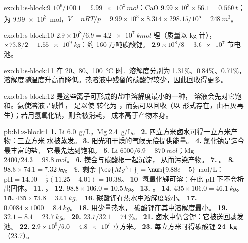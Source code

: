\begin{solution}{exo:b1:s-block:9}
$10^6/100.1 = \qty{9.99e3}{mol}$：CaO $9.99 \times 10^3 \times 56.1 =
\qty{0.560}{t}$； 为 \qty{9.99e3}{mol}，$V = nRT/p = 9.99 \times 10^3
\times 8.314 \times 298.15/10^5 = \qty{248}{m^3}$。
\end{solution}

\begin{solution}{exo:b1:s-block:10}
$2.9 \times 10^8/6.9 = \qty{4.2e7}{kmol}$ 锂（质量以 kg 计），$\times 73.8/2 =
\qty{1.55e9}{kg}$：约 160 万吨碳酸锂。
$2.9 \times 10^8/8 = \num{3.6e7}$ 节电池。
\end{solution}

\begin{solution}{exo:b1:s-block:11}
在 20、80、\qty{100}{\celsius} 时，溶解度分别为 1.31\%、0.84\%、0.71\%，
溶解度随温度升高而降低。热溶液中残留的碳酸锂较少，因此回收得更多。
\end{solution}

\begin{solution}{exo:b1:s-block:12}
 是这些离子可形成的盐中溶解度最小的一种，
溶液会先对它饱和。氨使溶液呈碱性，
足以使  转化为 ，而氨可以回收（以
 形式存在，由石灰再生）；若用氢氧化钠，则会被消耗，
成本高于产物本身。
\end{solution}

\begin{solution}{pb:b1:s-block:1}
\textbf{1.} Li \qty{6.0}{g/L}，Mg \qty{2.4}{g/L}。
\textbf{2.} 四立方米卤水可得一立方米产物：三立方米
水被蒸发。
\textbf{3.} 阳光和干燥的气候无偿提供能量。
\textbf{4.} 氯化钠是迄今最丰富的盐，
它最先达到饱和。
\textbf{5.} Li $6000/6.9 = \qty{870}{mol}$；Mg $2400/24.3 = \qty{98.8}{mol}$。
\textbf{6.} 镁会与碳酸根一起沉淀，
从而污染产物。
\textbf{7.} 。
\textbf{8.} $98.8 \times 74.1 = \qty{7.32}{kg}$。
\textbf{9.} 剩余 $[\ce{Mg^2+}] = \num{9.88e-5}$ mol/L：$\mathrm{pH} = 14.00 -
\frac12(11.25 - 4.01) = 10.38$。
\textbf{10.} 氢氧化锂可溶：在此 pH 下不会析出固体。
\textbf{11.} 。
\textbf{12.} $98.8 \times 106.0 = \qty{10.5}{kg}$。
\textbf{13.} 。
\textbf{14.} $435 \times 106.0 = \qty{46.1}{kg}$。
\textbf{15.} $435 \times 73.8 = \qty{32.1}{kg}$。
\textbf{16.} 碳酸锂在热水中溶解度较小。
\textbf{17.} $0.0084 \times 1000 = \qty{8.4}{kg}$。
\textbf{18.} 用少量热水，
碳酸锂在其中溶解度最小。
\textbf{19.} $32.1 - 8.4 = \qty{23.7}{kg}$。
\textbf{20.} $23.7/32.1 = \qty{74}{\percent}$。
\textbf{21.} 卤水中仍含锂：它被送回蒸发池。
\textbf{22.} $2.9 \times 10^8/6.0 = \num{4.8e7}$ 立方米。
\textbf{23.} 每立方米可得碳酸锂 \textbf{\qty{24}{kg}}
（23.7）。
\end{solution}
